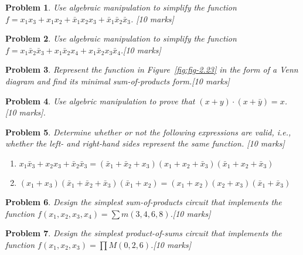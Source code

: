 \documentclass{article}
\newtheorem{prob}{Problem}
\newcommand{\bx}{\bar{x}}
\begin{document}
\begin{prob}
Use algebraic manipulation to simplify the function $f = x_1x_3 + x_1x_2 + \bx_1 x_2 x_3 + \bx_1 \bx_2 \bx_3$. [10 marks]
\end{prob}

\begin{prob}
Use algebraic manipulation to simplify the function $f = x_1\bx_2\bx_3 + x_1\bx_2x_4 + x_1\bx_2 x_3\bx_4$.[10 marks]
\end{prob}


\begin{prob}
Represent the function in Figure~\ref{fig:fig-2.23} in the form of a Venn diagram and find its minimal sum-of-products form.[10 marks]
\end{prob}

\begin{prob}
Use algebric manipulation to prove that $(x+y)\cdot(x+\bar{y}) = x$. [10 marks].
\end{prob}

\begin{prob}
Determine whether or not the following expressions are valid, i.e., whether the left- and
right-hand sides represent the same function.
[10 marks]
\begin{enumerate}
    \item $x_1 \bx_3 + x_2 x_3 + \bx_2 \bx_3 = (\bx_1 + \bx_2 + x_3)(x_1 + x_2 + \bx_3)(\bx_1 + x_2 + \bx_3)$
    \item $(x_1 + x_3)(\bx_1 + \bx_2 + \bx_3)(\bx_1 + x_2) = (x_1 + x_2)(x_2 + x_3)(\bx_1 + \bx_3)$
\end{enumerate}
\end{prob}

\begin{prob}
Design the simplest sum-of-products circuit that implements the function $f (x_1
, x_2 , x_3, x_4 ) = \sum m(3, 4, 6, 8)$.[10 marks]
\end{prob}

\begin{prob}
Design the simplest product-of-sums circuit that implements the function $f (x_1 , x_2 , x_3 ) = \prod M (0, 2, 6)$.[10 marks]
\end{prob}




\end{document}
